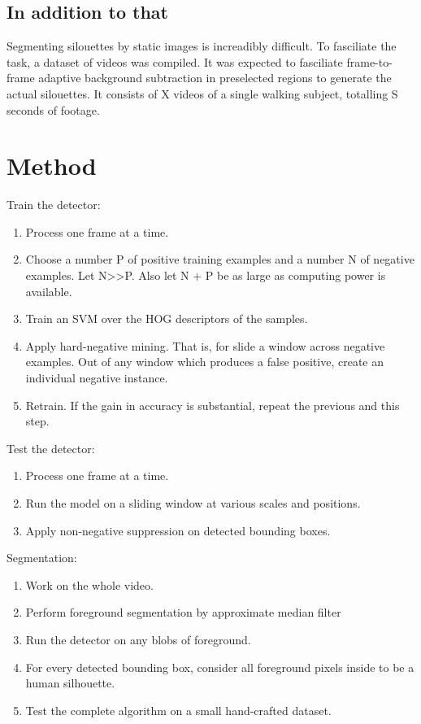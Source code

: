 \documentclass{article}
\begin{document}
\subsection{In addition to that}
Segmenting silouettes by static images is increadibly difficult.
To fasciliate the task, a dataset of videos was compiled.
It was expected to fasciliate frame-to-frame adaptive background subtraction in preselected regions to generate the actual silouettes.
It consists of X videos of a single walking subject, totalling S seconds of footage.


\section{Method}
Train the detector:
\begin{enumerate}
\item{Process one frame at a time.}
\item{Choose a number P of positive training examples and a number N of negative examples. Let N>>P. Also let N + P be as large as computing power is available.}
\item{Train an SVM over the HOG descriptors of the samples.}
\item{Apply hard-negative mining. That is, for slide a window across negative examples. Out of any window which produces a false positive, create an individual negative instance.}
\item{Retrain. If the gain in accuracy is substantial, repeat the previous and this step.}
\end{enumerate}

Test the detector:
\begin{enumerate}
\item{Process one frame at a time.}
\item{Run the model on a sliding window at various scales and positions.}
\item{Apply non-negative suppression on detected bounding boxes.}
\end{enumerate}

Segmentation:
\begin{enumerate}
\item{Work on the whole video.}
\item{Perform foreground segmentation by approximate median filter\cite{amf}}
\item{Run the detector on any blobs of foreground.}
\item{For every detected bounding box, consider all foreground pixels inside to be a human silhouette.}
\item{Test the complete algorithm on a small hand-crafted dataset.}
\end{enumerate}
\end{document}
